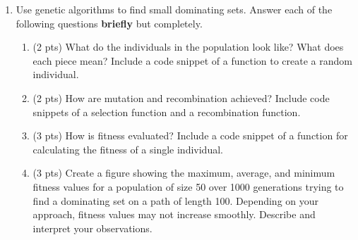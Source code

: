 \documentclass{article}
\begin{document}
\begin{enumerate}
    \item Use genetic algorithms to find small dominating sets. Answer each of the following questions \textbf{briefly} but completely.
    \begin{enumerate}
        \item (2 pts) What do the individuals in the population look like? What does each piece mean? Include a code snippet of a function to create a random individual.
        \item (2 pts) How are mutation and recombination achieved? Include code snippets of a selection function and a recombination function.
        \item (3 pts) How is fitness evaluated? Include a code snippet of a function for calculating the fitness of a single individual.
        \item (3 pts) Create a figure showing the maximum, average, and minimum fitness values for a population of size 50 over 1000 generations trying to find a dominating set on a path of length 100. Depending on your approach, fitness values may not increase smoothly. Describe and interpret your observations.
    \end{enumerate}
        

    
\end{enumerate}


\end{document}
